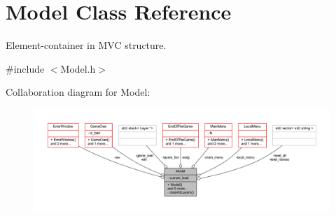 \hypertarget{class_model}{}\section{Model Class Reference}
\label{class_model}


Element-\/container in M\+VC structure.  




{\ttfamily \#include $<$Model.\+h$>$}



Collaboration diagram for Model\+:
\nopagebreak
\begin{figure}[H]
\begin{center}
\leavevmode
\includegraphics[width=350pt]{class_model__coll__graph}
\end{center}
\end{figure}
